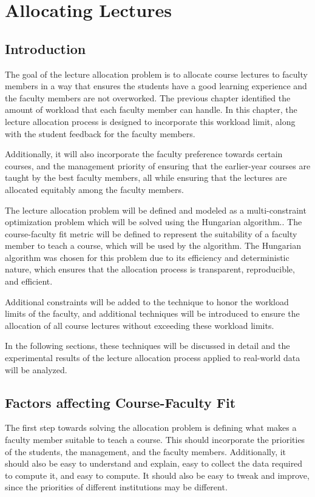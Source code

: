 
\chapter{Allocating Lectures}

\section{Introduction}

The goal of the lecture allocation problem is to allocate course lectures to faculty members in a way that ensures the students have a good learning experience and the faculty members are not overworked. The previous chapter identified the amount of workload that each faculty member can handle. In this chapter, the lecture allocation process is designed to incorporate this workload limit, along with the student feedback for the faculty members.

Additionally, it will also incorporate the faculty preference towards certain courses, and the management priority of ensuring that the earlier-year courses are taught by the best faculty members, all while ensuring that the lectures are allocated equitably among the faculty members.

The lecture allocation problem will be defined and modeled as a multi-constraint optimization problem which will be solved using the Hungarian algorithm.. The course-faculty fit metric will be defined to represent the suitability of a faculty member to teach a course, which will be used by the algorithm. The Hungarian algorithm was chosen for this problem due to its efficiency and deterministic nature, which ensures that the allocation process is transparent, reproducible, and efficient.

Additional constraints will be added to the technique to honor the workload limits of the faculty, and additional techniques will be introduced to ensure the allocation of all course lectures without exceeding these workload limits.

In the following sections, these techniques will be discussed in detail and the experimental results of the lecture allocation process applied to real-world data will be analyzed.

\section{Factors affecting Course-Faculty Fit}

The first step towards solving the allocation problem is defining what makes a faculty member suitable to teach a course. This should incorporate the priorities of the students, the management, and the faculty members. Additionally, it should also be easy to understand and explain, easy to collect the data required to compute it, and easy to compute. It should also be easy to tweak and improve, since the priorities of different institutions may be different.

